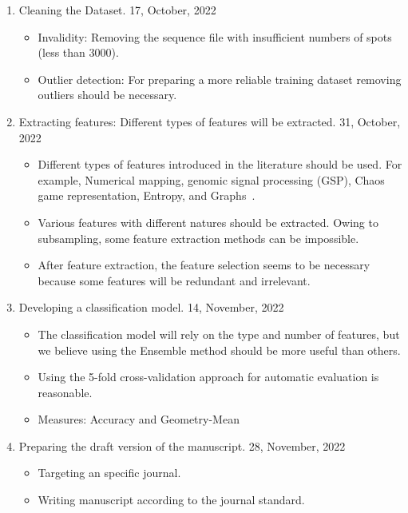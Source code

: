 \documentclass[a4paper]{article}
\newcommand{\deadline}[1]{{\color{blue} \hfill{#1} }}
\begin{document}
\begin{enumerate}
\begin{itemize}
        \end{itemize}
        \item Cleaning the Dataset. \deadline{17, October, 2022}
        \begin{itemize}
            \item Invalidity: Removing the sequence file with insufficient numbers of spots (less than 3000).
            \item Outlier detection: For preparing a more reliable training dataset removing outliers should be necessary.
        \end{itemize}
        \item Extracting features: Different types of features will be extracted. \deadline{31, October, 2022}
        \begin{itemize}
            \item Different types of features introduced in the literature should be used.
            For example, Numerical mapping, genomic signal processing (GSP), Chaos game representation, Entropy, and Graphs~\cite{RF101}.
            \item Various features with different natures should be extracted.
            Owing to subsampling, some feature extraction methods can be impossible.
            \item After feature extraction, the feature selection seems to be necessary because some features will be redundant and irrelevant.
        \end{itemize}
        \item Developing a classification model.\deadline{14, November, 2022}
        \begin{itemize}
            \item The classification model will rely on the type and number of features, but we believe using the Ensemble method should be more useful than others.
            \item Using the 5-fold cross-validation approach for automatic evaluation is reasonable.
            \item Measures: Accuracy and Geometry-Mean
        \end{itemize}
        \item Preparing the draft version of the manuscript. \deadline{28, November, 2022}
        \begin{itemize}
            \item Targeting an specific journal.
            \item Writing manuscript according to the journal standard.

\end{itemize}
\end{enumerate}
\end{document}
